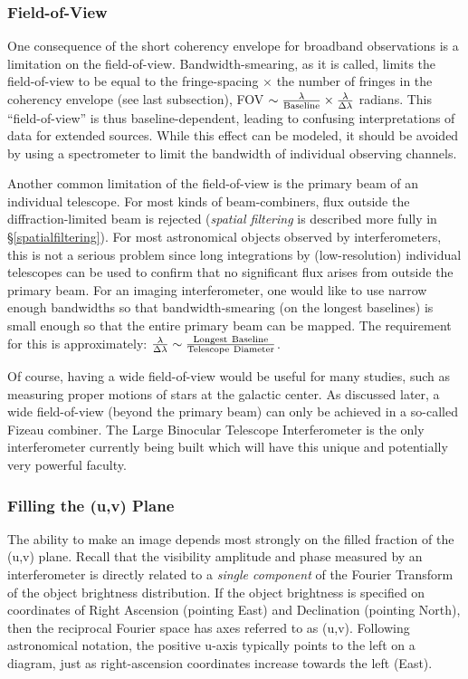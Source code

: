 \documentclass[12pt]{iopart}
\begin{document}
\subsubsection{Field-of-View}
One consequence of the short coherency envelope for broadband
observations is a limitation on the field-of-view. Bandwidth-smearing,
as it is called, limits the field-of-view to be equal to the
fringe-spacing $\times$ the number of fringes in the coherency
envelope (see last subsection), FOV $ \sim \frac{\lambda}{\rm
  Baseline} \times \frac{\lambda}{\Delta \lambda}$ radians.  This
``field-of-view'' is thus baseline-dependent, leading to confusing
interpretations of data for extended sources. While this effect can be
modeled, it should be avoided by using a spectrometer to limit the
bandwidth of individual observing channels.

Another common limitation of the field-of-view is the primary beam of
an individual telescope.  For most kinds of beam-combiners, flux
outside the diffraction-limited beam is rejected ({\em spatial
  filtering} is described more fully in \S\ref{spatialfiltering}).
For most astronomical objects observed by interferometers, this is not
a serious problem since long integrations by (low-resolution)
individual telescopes can be used to confirm that no significant flux
arises from outside the primary beam.  For an imaging interferometer,
one would like to use narrow enough bandwidths so that
bandwidth-smearing (on the longest baselines) is small enough so that
the entire primary beam can be mapped. The requirement for this is
approximately: $\frac{\lambda}{\Delta \lambda} \sim \frac{\rm
  Longest~Baseline}{\rm Telescope~Diameter}$.

Of course, having a wide field-of-view would be useful for many
studies, such as measuring proper motions of stars at the galactic
center.  As discussed later, a wide field-of-view (beyond the primary
beam) can only be achieved in a so-called Fizeau combiner.  The Large
Binocular Telescope Interferometer is the only interferometer
currently being built which will have this unique and potentially very
powerful faculty.

\subsubsection{Filling the (u,v) Plane}
\label{uvplane}

The ability to make an image depends most strongly on the 
filled fraction of the  (u,v) plane.  Recall
that the visibility amplitude and phase measured by an interferometer
is directly related to a {\em single component} of the Fourier Transform of the
object brightness distribution.  If the object brightness is 
specified on coordinates of Right Ascension (pointing East) and
Declination (pointing North), then the reciprocal Fourier space
has axes referred to as (u,v).  Following astronomical notation, the positive u-axis
typically points to the left on a diagram, just as right-ascension coordinates 
increase towards the left (East).  
\end{document}
